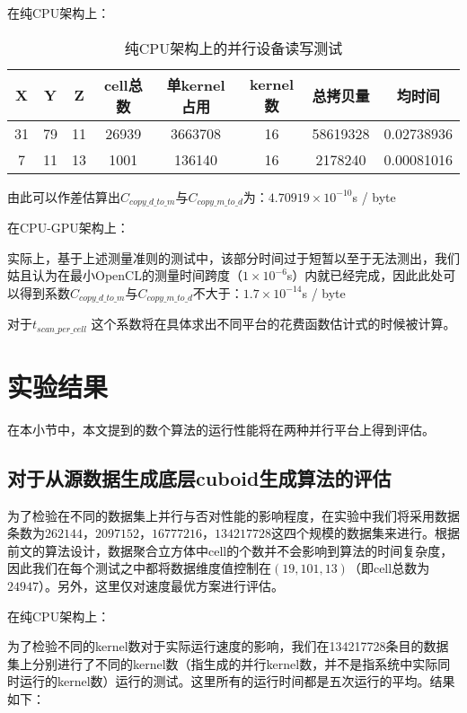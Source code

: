 在纯CPU架构上：
\begin{table}[!htbp]
\centering
\caption{纯CPU架构上的并行设备读写测试} 
\label{tab:table3}
\begin{tabular}{|c|c|c|c|c|c|c|c|}
    \hline
    X & Y & Z & cell总数 & 单kernel占用 & kernel数 & 总拷贝量 & 均时间\\
    \hline
    31 & 79 & 11 & 26939 & 3663708 & 16 & 58619328 & 0.02738936\\
    \hline
    7 & 11 & 13 & 1001 & 136140 & 16 & 2178240 & 0.00081016\\
    \hline
\end{tabular}
\end{table}

由此可以作差估算出$C_{copy\_d\_to\_m}$与$C_{copy\_m\_to\_d}$为：$4.70919 \times 10^{-10}$s / byte

在CPU-GPU架构上：

实际上，基于上述测量准则的测试中，该部分时间过于短暂以至于无法测出，我们姑且认为在最小OpenCL的测量时间跨度（$1 \times 10^{-6}$s）内就已经完成，因此此处可以得到系数$C_{copy\_d\_to\_m}$与$C_{copy\_m\_to\_d}$不大于：$1.7 \times 10^{-14}$s / byte

对于$t_{scan\_per\_cell}$
这个系数将在具体求出不同平台的花费函数估计式的时候被计算。

\section{实验结果}
在本小节中，本文提到的数个算法的运行性能将在两种并行平台上得到评估。

\subsection{对于从源数据生成底层cuboid生成算法的评估}

为了检验在不同的数据集上并行与否对性能的影响程度，在实验中我们将采用数据条数为$262144$，$2097152$，$16777216$，$134217728$这四个规模的数据集来进行。根据前文的算法设计，数据聚合立方体中cell的个数并不会影响到算法的时间复杂度，因此我们在每个测试之中都将数据维度值控制在$(19, 101, 13)$（即cell总数为$24947$）。另外，这里仅对速度最优方案进行评估。

在纯CPU架构上：

为了检验不同的kernel数对于实际运行速度的影响，我们在134217728条目的数据集上分别进行了不同的kernel数（指生成的并行kernel数，并不是指系统中实际同时运行的kernel数）运行的测试。这里所有的运行时间都是五次运行的平均。结果如下：

